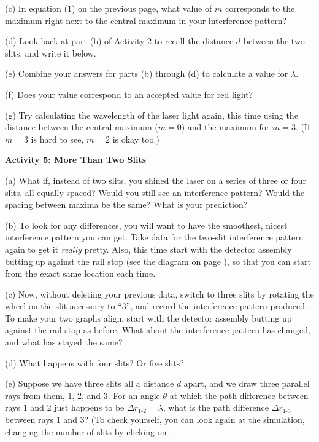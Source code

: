 (c) In equation (1) on the previous page, what value of $m$ corresponds to the maximum right next to the central maximum in your interference pattern?
\answerspace{0.3in}
 
(d) Look back at part (b) of Activity 2 to recall the distance $d$ between the two slits, and write it below.
\answerspace{0.3in}

(e) Combine your answers for parts (b) through (d) to calculate a value for $\lambda$.  
\answerspace{1in}

(f) Does your value correspond to an accepted value for red light?
\answerspace{0.3in}

(g) Try calculating the wavelength of the laser light again, this time using the distance between the central maximum ($m=0$) and the maximum for $m=3$.  (If $m=3$ is hard to see, $m=2$ is okay too.)
\answerspace{0.9in}


\pagebreak[2]
\textbf{Activity 5: More Than Two Slits}

(a) What if, instead of two slits, you shined the laser on a series of three or four slits, all equally spaced?  Would you still see an interference pattern?  Would the spacing between maxima be the same?  What is your prediction?
\answerspace{0.8in}

(b) To look for any differences, you will want to have the smoothest, nicest interference pattern you can get.  Take data for the two-slit interference pattern again to get it \textit{really} pretty.  Also, this time start with the detector assembly butting up against the rail stop (see the diagram on page \pageref{figure_rail_stop}), so that you can start from the exact same location each time.

(c) Now, without deleting your previous data, switch to three slits by rotating the wheel on the slit accessory 
to ``3'', and record the interference pattern produced.
To make your two graphs align, start with the detector assembly butting up against the rail stop as before.  
What about the interference pattern has changed, and what has stayed the same?
\answerspace{0.8in}

(d) What happens with four slits?  Or five slits?
\answerspace{0.8in}

(e) Suppose we have three slits all a distance $d$ apart, and we draw three parallel rays from them, 1, 2, and 3.  For an angle $\theta$ at which the path difference between rays 1 and 2 just happens to be $\Delta r_\text{1-2} = \lambda$, what is the path difference $\Delta r_\text{1-3}$ between rays 1 and 3?  (To check yourself, you can look again at the simulation, changing the number of slits by clicking on .

